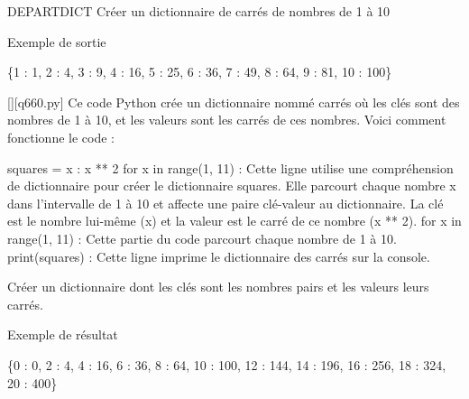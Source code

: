 
        \question
        DEPARTDICT
Créer un dictionnaire de carrés de nombres de 1 à 10

Exemple de sortie

\{1 : 1, 2 : 4, 3 : 9, 4 : 16, 5 : 25, 6 : 36, 7 : 49, 8 : 64, 9 : 81, 10 : 100\}
        \par
        \begin{solution}
            \renewcommand{\nomfichier}{q660.py}
            \pythonfile{\chemincode \nomfichier}[][\nomfichier]
            Ce code Python crée un dictionnaire nommé carrés où les clés sont des nombres de 1 à 10, et les valeurs sont les carrés de ces nombres. Voici comment fonctionne le code :

    squares = {x : x ** 2 for x in range(1, 11)} : Cette ligne utilise une compréhension de dictionnaire pour créer le dictionnaire squares. Elle parcourt chaque nombre x dans l'intervalle de 1 à 10 et affecte une paire clé-valeur au dictionnaire. La clé est le nombre lui-même (x) et la valeur est le carré de ce nombre (x ** 2).
        for x in range(1, 11) : Cette partie du code parcourt chaque nombre de 1 à 10.
    print(squares) : Cette ligne imprime le dictionnaire des carrés sur la console.
        \end{solution}
        

        \question
        Créer un dictionnaire dont les clés sont les nombres pairs et les valeurs leurs carrés.

Exemple de résultat

\{0 : 0, 2 : 4, 4 : 16, 6 : 36, 8 : 64, 10 : 100, 12 : 144, 14 : 196, 16 : 256, 18 : 324, 20 : 400\}
        \par
        


